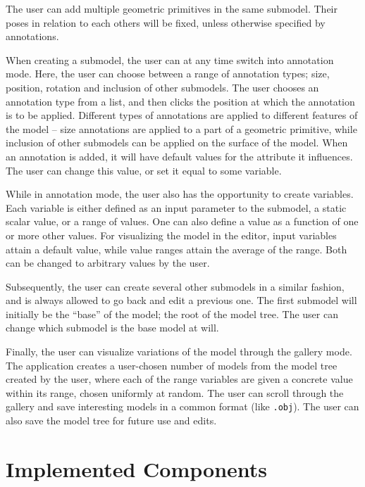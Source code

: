 \documentclass[english]{article}
\begin{document}
The user can add multiple geometric primitives in the same submodel. Their poses in relation to each others will be fixed, unless otherwise specified by annotations.


When creating a submodel, the user can at any time switch into annotation mode. Here, the user can choose between a range of annotation types; size, position, rotation and inclusion of other submodels. The user chooses an annotation type from a list, and then clicks the position at which the annotation is to be applied. Different types of annotations are applied to different features of the model -- size annotations are applied to a part of a geometric primitive, while inclusion of other submodels can be applied on the surface of the model. When an annotation is added, it will have default values for the attribute it influences. The user can change this value, or set it equal to some variable.

While in annotation mode, the user also has the opportunity to create variables. Each variable is either defined as an input parameter to the submodel, a static scalar value, or a range of values. One can also define a value as a function of one or more other values. For visualizing the model in the editor, input variables attain a default value, while value ranges attain the average of the range. Both can be changed to arbitrary values by the user.

Subsequently, the user can create several other submodels in a similar fashion, and is always allowed to go back and edit a previous one. The first submodel will initially be the ``base'' of the model; the root of the model tree. The user can change which submodel is the base model at will.


Finally, the user can visualize variations of the model through the gallery mode. The application creates a user-chosen number of models from the model tree created by the user, where each of the range variables are given a concrete value within its range, chosen uniformly at random. The user can scroll through the gallery and save interesting models in a common format (like \texttt{.obj}). The user can also save the model tree for future use and edits.

\pagebreak

\section{Implemented Components} \label{section_components}
\end{document}
